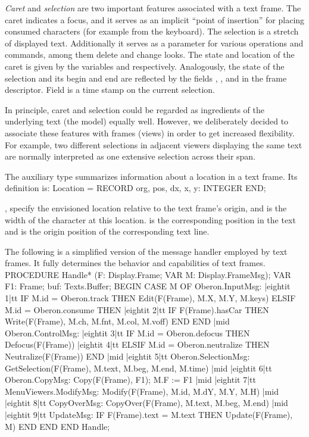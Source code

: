 \emph{Caret} and \emph{selection} are two important features associated with a text frame. The caret indicates a focus, and it serves as an implicit ``point of insertion'' for placing consumed characters (for example from the keyboard). The selection is a stretch of displayed text. Additionally it serves as a parameter for various operations and commands, among them delete and change looks. The state and location of the caret is given by the variables  and  respectively. Analogously, the state of the selection and its begin and end are reflected by the fields , , and  in the frame descriptor. Field  is a time stamp on the current selection.

In principle, caret and selection could be regarded as ingredients of the underlying text (the model) equally well. However, we deliberately decided to associate these features with frames (views) in order to get increased flexibility. For example, two different selections in adjacent viewers displaying the same text are normally interpreted as one extensive selection across their span.

The auxiliary type  summarizes information about a location in a text frame. Its definition is:
\begintt
Location = RECORD
  org, pos, dx, x, y: INTEGER
END;
\endtt

\noindent {},  specify the envisioned location relative to the text frame's origin, and  is the width of the character at this location.  is the corresponding position in the text and  is the origin position of the corresponding text line.

The following is a simplified version of the message handler employed by text frames. It fully determines the behavior and capabilities of text frames.
\begintt
PROCEDURE Handle* (F: Display.Frame; VAR M: Display.FrameMsg);
  VAR F1: Frame;
  buf: Texts.Buffer;
BEGIN
  CASE M OF
  Oberon.InputMsg:
|eightit 1|tt    IF M.id = Oberon.track THEN Edit(F(Frame), M.X, M.Y, M.keys)
    ELSIF M.id = Oberon.consume THEN
|eightit 2|tt    IF F(Frame).hasCar THEN Write(F(Frame), M.ch, M.fnt, M.col, M.voff)
    END END |mid
  Oberon.ControlMsg:
|eightit 3|tt    IF M.id = Oberon.defocus THEN Defocus(F(Frame))
|eightit 4|tt    ELSIF M.id = Oberon.neutralize THEN Neutralize(F(Frame))
    END |mid
|eightit 5|tt  Oberon.SelectionMsg:
    GetSelection(F(Frame), M.text, M.beg, M.end, M.time) |mid
|eightit 6|tt  Oberon.CopyMsg:
    Copy(F(Frame), F1); M.F := F1 |mid
|eightit 7|tt  MenuViewers.ModifyMsg:
    Modify(F(Frame), M.id, M.dY, M.Y, M.H) |mid
|eightit 8|tt  CopyOverMsg:
    CopyOver(F(Frame), M.text, M.beg, M.end) |mid
|eightit 9|tt  UpdateMsg:
    IF F(Frame).text = M.text THEN Update(F(Frame), M) END
  END
END Handle;
\endtt

